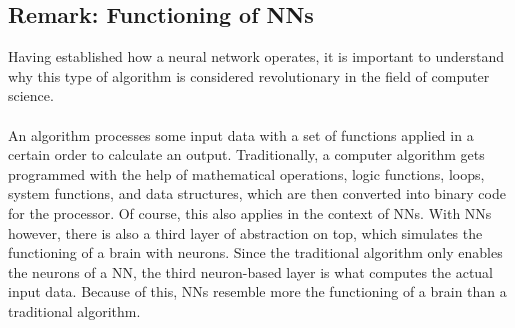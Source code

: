\subsection{Remark: Functioning of NNs}\label{subsec:remark-about-the-funtioning-of-nns}
Having established how a neural network operates, it is important to understand why this type of algorithm is considered revolutionary in the field of computer science.
\\ \\
An algorithm processes some input data with a set of functions applied in a certain order to calculate an output.
Traditionally, a computer algorithm gets programmed with the help of mathematical operations, logic functions, loops, system functions, and data structures, which are then converted into binary code for the processor.
Of course, this also applies in the context of NNs.
With NNs however, there is also a third layer of abstraction on top, which simulates the functioning of a brain with neurons.
Since the traditional algorithm only enables the neurons of a NN, the third neuron-based layer is what computes the actual input data.
Because of this, NNs resemble more the functioning of a brain than a traditional algorithm.
\\
